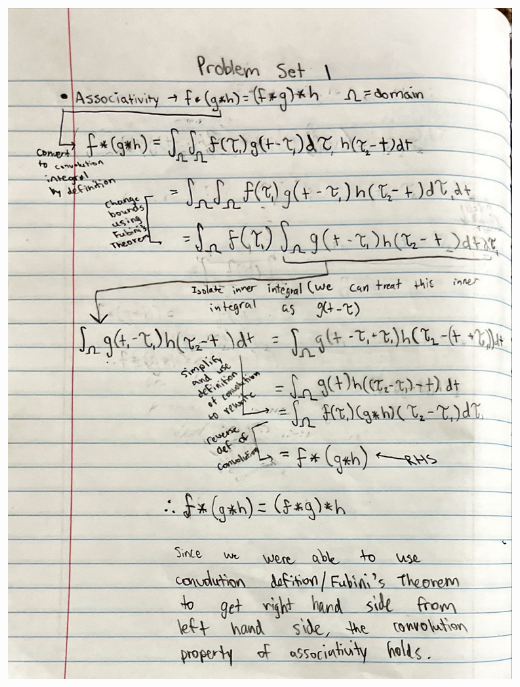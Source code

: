 \documentclass[12pt]{article}
\begin{document}
\includegraphics[scale=0.18]{Associativity.jpeg}\\\\




\end{document}
